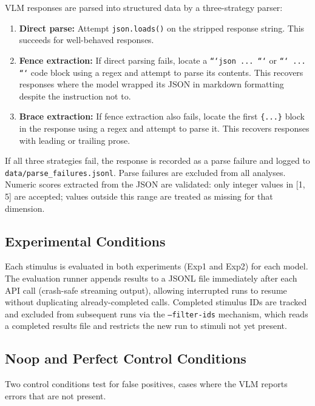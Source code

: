 VLM responses are parsed into structured data by a three-strategy parser:

\begin{enumerate}
    \item \textbf{Direct parse:} Attempt \texttt{json.loads()} on the stripped response string. This succeeds for well-behaved responses.
    \item \textbf{Fence extraction:} If direct parsing fails, locate a \texttt{```json ... ```} or \texttt{``` ... ```} code block using a regex and attempt to parse its contents. This recovers responses where the model wrapped its JSON in markdown formatting despite the instruction not to.
    \item \textbf{Brace extraction:} If fence extraction also fails, locate the first \texttt{\{...\}} block in the response using a regex and attempt to parse it. This recovers responses with leading or trailing prose.
\end{enumerate}

If all three strategies fail, the response is recorded as a parse failure and logged to \texttt{data/parse\_failures.jsonl}. Parse failures are excluded from all analyses. Numeric scores extracted from the JSON are validated: only integer values in [1, 5] are accepted; values outside this range are treated as missing for that dimension.

\subsection{Experimental Conditions} \label{Experimental Conditions}

Each stimulus is evaluated in both experiments (Exp1 and Exp2) for each model. The evaluation runner appends results to a JSONL file immediately after each API call (crash-safe streaming output), allowing interrupted runs to resume without duplicating already-completed calls. Completed stimulus IDs are tracked and excluded from subsequent runs via the \texttt{--filter-ids} mechanism, which reads a completed results file and restricts the new run to stimuli not yet present.

\subsection{Noop and Perfect Control Conditions} \label{Noop and Perfect Control Conditions}

Two control conditions test for false positives, cases where the VLM reports errors that are not present.

